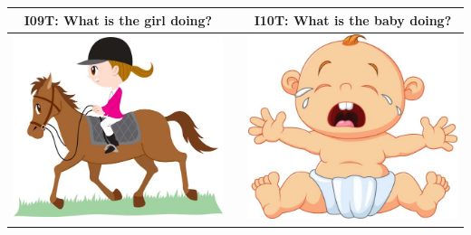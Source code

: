 \documentclass[12pt,notitlepage]{article}
\begin{document}
\begin{center}
\begin{tabular}{|c|c|c|}
\hline
I09T: What is the girl doing? && I10T: What is the baby doing? \\
\hline
\includegraphics[width=20em,trim=0 0 0 -3]{figures/I09.jpg} & & \includegraphics[width=20em,trim=0 0 0 -3]{figures/I10.jpg} \\
\hline
\end{tabular}
\vspace{1em} \\



\end{center}
\end{document}
